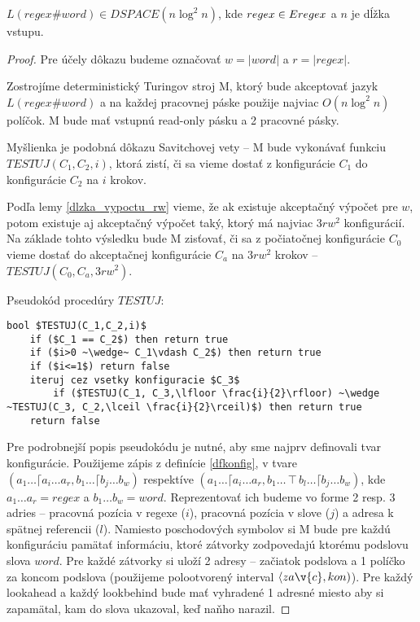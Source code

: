 \begin{veta}\label{dspace_nlog2n}
$L(regex\#word) \in DSPACE(n \log^2 n)$, kde $regex \in Eregex$ a $n$ je dĺžka vstupu.
\end{veta}
\begin{proof}
Pre účely dôkazu budeme označovať $w = |word|$ a $r = |regex|$.

Zostrojíme deterministický Turingov stroj M, ktorý bude akceptovať jazyk $L(regex\#word)$ a na každej pracovnej páske použije najviac $O(n\log^2 n)$ políčok. M bude mať vstupnú read-only pásku a 2 pracovné pásky.

Myšlienka je podobná dôkazu Savitchovej vety \cite{Savitch_skripta} -- M bude vykonávať funkciu $TESTUJ(C_1,C_2,i)$, ktorá zistí, či sa vieme dostať z konfigurácie $C_1$ do konfigurácie $C_2$ na $i$ krokov. 

Podľa lemy \ref{dlzka_vypoctu_rw} vieme, že ak existuje akceptačný výpočet pre $w$, potom existuje aj akceptačný výpočet taký, ktorý má najviac $3rw^2$ konfigurácií. Na základe tohto výsledku bude M zisťovať, či sa z počiatočnej konfigurácie $C_0$ vieme dostať do akceptačnej konfigurácie $C_a$ na $3rw^2$ krokov -- $TESTUJ(C_0,C_a,3rw^2)$.

Pseudokód procedúry $TESTUJ$:
\begin{lstlisting}[mathescape]
bool $TESTUJ(C_1,C_2,i)$
	if ($C_1 == C_2$) then return true
	if ($i>0 ~\wedge~ C_1\vdash C_2$) then return true
	if ($i<=1$) return false
	iteruj cez vsetky konfiguracie $C_3$
		if ($TESTUJ(C_1, C_3,\lfloor \frac{i}{2}\rfloor) ~\wedge ~TESTUJ(C_3, C_2,\lceil \frac{i}{2}\rceil)$) then return true
	return false
\end{lstlisting}

Pre podrobnejší popis pseudokódu je nutné, aby sme najprv definovali tvar konfigurácie. Použijeme zápis z definície \ref{dfkonfig}, v tvare $(a_1\dots \lceil a_i \dots a_r, b_1 \dots\lceil b_j \dots b_w)$ respektíve $(a_1\dots \lceil a_i \dots a_r, b_1 \ldots \intercal b_l \dots \lceil b_j \dots b_w)$, kde $a_1\dots a_r = regex$ a $b_1\dots b_w = word$. Reprezentovať ich budeme vo forme 2 resp. 3 adries -- pracovná pozícia v regexe ($i$), pracovná pozícia v slove ($j$) a adresa k spätnej referencii ($l$). Namiesto poschodových symbolov si M bude pre každú konfiguráciu pamätať informáciu, ktoré zátvorky zodpovedajú ktorému podslovu slova $word$. Pre každé zátvorky si uloží 2 adresy -- začiatok podslova a 1 políčko za koncom podslova (použijeme polootvorený interval $\langle za\v{c},kon)$). Pre každý lookahead a každý lookbehind bude mať vyhradené 1 adresné miesto aby si zapamätal, kam do slova ukazoval, keď naňho narazil.


\end{proof}
